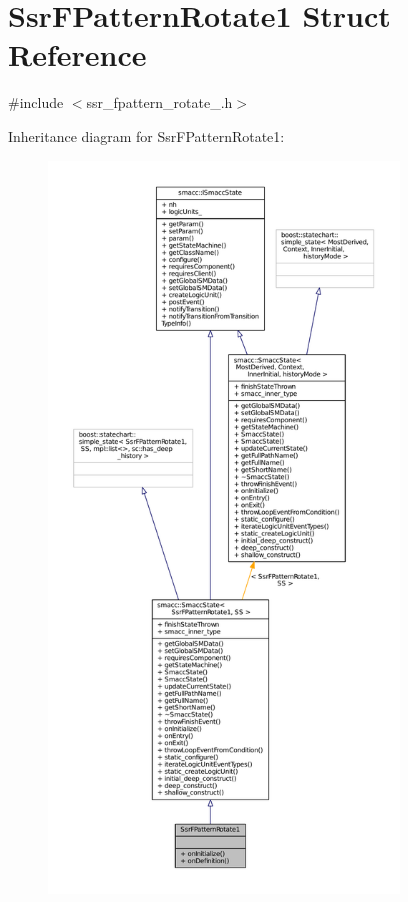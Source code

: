 \hypertarget{structSsrFPatternRotate1}{}\section{Ssr\+F\+Pattern\+Rotate1 Struct Reference}
\label{structSsrFPatternRotate1}


{\ttfamily \#include $<$ssr\+\_\+fpattern\+\_\+rotate\+\_.\+h$>$}



Inheritance diagram for Ssr\+F\+Pattern\+Rotate1\+:
\nopagebreak
\begin{figure}[H]
\begin{center}
\leavevmode
\includegraphics[height=550pt]{structSsrFPatternRotate1__inherit__graph}
\end{center}
\end{figure}


